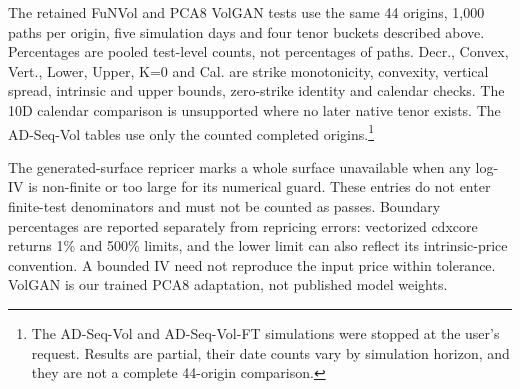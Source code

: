 \documentclass[11pt]{article}
\begin{document}
The retained FuNVol and PCA8 VolGAN tests use the same 44 origins, 1,000 paths per origin, five simulation days and four tenor buckets described above. Percentages are pooled test-level counts, not percentages of paths. Decr., Convex, Vert., Lower, Upper, K=0 and Cal. are strike monotonicity, convexity, vertical spread, intrinsic and upper bounds, zero-strike identity and calendar checks. The 10D calendar comparison is unsupported where no later native tenor exists. The AD-Seq-Vol tables use only the counted completed origins.\footnote{The AD-Seq-Vol and AD-Seq-Vol-FT simulations were stopped at the user's request. Results are partial, their date counts vary by simulation horizon, and they are not a complete 44-origin comparison.}

The generated-surface repricer marks a whole surface unavailable when any log-IV is non-finite or too large for its numerical guard. These entries do not enter finite-test denominators and must not be counted as passes. Boundary percentages are reported separately from repricing errors: vectorized cdxcore returns 1\% and 500\% limits, and the lower limit can also reflect its intrinsic-price convention. A bounded IV need not reproduce the input price within tolerance. VolGAN is our trained PCA8 adaptation, not published model weights.
\end{document}
